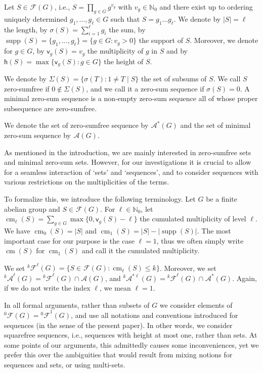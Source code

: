 \documentclass{amsart}
\theoremstyle{definition}
\numberwithin{equation}{section}
\begin{document}
Let $S\in {{}^{{}}\!\mathcal{F}} (G)$, i.e., $S= \prod_{g\in G}g^{v_g}$ with $v_g\in \mathbb{N}_0$ and there exist up to ordering uniquely determined $g_1, \dots, g_{\ell}\in G$
such that $S=g_1 \dots g_{\ell}$.
We denote by $|S|=\ell$ the length, by $\sigma(S)= \sum_{i=1}^{\ell}g_i$  the sum, by $\operatorname{supp}(S)=\{g_1,\dots,g_{\ell}\}=\{g \in G \colon v_g > 0\}$ the support of $S$.
Moreover, we denote for $g\in G$, by $\mathsf{v}_g(S)=v_g$ the multiplicity of
$g$ in $S$ and by $\mathsf{h}(S)=\max \{\mathsf{v}_g(S)\colon g \in G\}$ the height of $S$.

We denote by
$\Sigma(S)=\{\sigma(T)\colon 1 \neq T \mid S\}$ the set of subsums of $S$.
We call $S$ zero-sumfree if $0 \notin \Sigma(S)$, and we call it a zero-sum sequence if $\sigma(S)= 0$.
A minimal zero-sum sequence is a non-empty zero-sum sequence all of whose
proper subsequence are zero-sumfree.

We denote the set of zero-sumfree sequence by ${{}^{{}}\!\mathcal{A}^{\ast}} (G)$ and
the set of minimal zero-sum sequence by ${{}^{{}}\!\mathcal{A}} (G)$.

As mentioned in the introduction, we are mainly interested in zero-sumfree sets and minimal zero-sum sets. However, for our investigations it is crucial to allow for a seamless interaction of `sets' and `sequences', and to consider
sequences with various restrictions on the multiplicities of the terms.

To formalize this, we introduce the following terminology.
Let $G$ be a finite abelian group and $S \in {{}^{{}}\!\mathcal{F}}(G)$.
For $\ell\in \mathbb{N}_0$, let $\operatorname{cm}_{\ell}(S) = \sum_{g \in G} \max \{0, \mathsf{v}_g(S)-\ell \}$ the cumulated multiplicity of
level $\ell$. We have $\operatorname{cm}_0(S)=|S|$ and $\operatorname{cm}_1(S)=|S|-|\operatorname{supp}(S)|$.
The most important case for our purpose is the case $\ell=1$,
thus we often simply write $\operatorname{cm}(S)$ for $\operatorname{cm}_1(S)$ and call it the cumulated multiplicity.

We set ${{}^{{k}}\!\mathcal{F}}^{\ell} (G)= \{S \in {{}^{{}}\!\mathcal{F}} (G)\colon \operatorname{cm}_{\ell}(S)\le k\}$.
Moreover, we set ${{}^{{k}}\!\mathcal{A}}^{\ell}(G) = {{}^{{k}}\!\mathcal{F}}^{\ell} (G) \cap {{}^{{}}\!\mathcal{A}} (G)$, and ${}^{k}\!\mathcal{A}^{\ast  \ell} (G)= {{}^{{k}}\!\mathcal{F}}^{\ell} (G) \cap {{}^{{}}\!\mathcal{A}^{\ast}} (G)$.
Again, if we do not write the index $\ell$, we mean $\ell= 1$.

In all formal arguments, rather than subsets of $G$ we consider elements of ${{}^{{0}}\!\mathcal{F}}(G)={{}^{{0}}\!\mathcal{F}}^1(G)$, and use all notations and conventions introduced for sequences (in the sense of the present paper). In other words, we consider squarefree sequences, i.e., sequences with height at most one, rather than sets. At some points of our arguments, this admittedly causes some inconveniences, yet we prefer this over the ambiguities that would result from mixing notions for sequences and sets, or using multi-sets.
\end{document}
